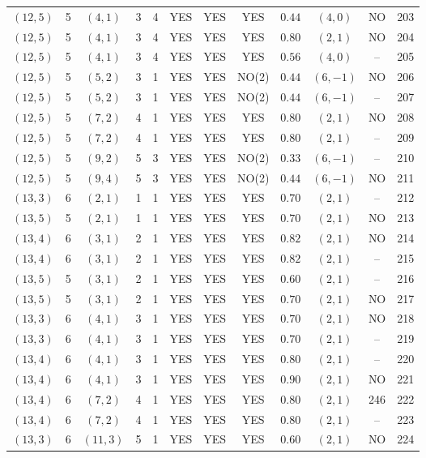 \begin{longtable}{|c|c|c|c|c|c|c|c|c|c|c|c|}
$(12,5)$ & 5 & $(4,1)$ & 3 & 4 & YES & YES & YES & $0.44$ & $(4,0)$ & NO & 203\\
$(12,5)$ & 5 & $(4,1)$ & 3 & 4 & YES & YES & YES & $0.80$ & $(2,1)$ & NO & 204\\
$(12,5)$ & 5 & $(4,1)$ & 3 & 4 & YES & YES & YES & $0.56$ & $(4,0)$ & -- & 205\\
$(12,5)$ & 5 & $(5,2)$ & 3 & 1 & YES & YES & NO(2) & $0.44$ & $(6,-1)$ & NO & 206\\
$(12,5)$ & 5 & $(5,2)$ & 3 & 1 & YES & YES & NO(2) & $0.44$ & $(6,-1)$ & -- & 207\\
$(12,5)$ & 5 & $(7,2)$ & 4 & 1 & YES & YES & YES & $0.80$ & $(2,1)$ & NO & 208\\
$(12,5)$ & 5 & $(7,2)$ & 4 & 1 & YES & YES & YES & $0.80$ & $(2,1)$ & -- & 209\\
$(12,5)$ & 5 & $(9,2)$ & 5 & 3 & YES & YES & NO(2) & $0.33$ & $(6,-1)$ & -- & 210\\
$(12,5)$ & 5 & $(9,4)$ & 5 & 3 & YES & YES & NO(2) & $0.44$ & $(6,-1)$ & NO & 211\\
$(13,3)$ & 6 & $(2,1)$ & 1 & 1 & YES & YES & YES & $0.70$ & $(2,1)$ & -- & 212\\
$(13,5)$ & 5 & $(2,1)$ & 1 & 1 & YES & YES & YES & $0.70$ & $(2,1)$ & NO & 213\\
$(13,4)$ & 6 & $(3,1)$ & 2 & 1 & YES & YES & YES & $0.82$ & $(2,1)$ & NO & 214\\
$(13,4)$ & 6 & $(3,1)$ & 2 & 1 & YES & YES & YES & $0.82$ & $(2,1)$ & -- & 215\\
$(13,5)$ & 5 & $(3,1)$ & 2 & 1 & YES & YES & YES & $0.60$ & $(2,1)$ & -- & 216\\
$(13,5)$ & 5 & $(3,1)$ & 2 & 1 & YES & YES & YES & $0.70$ & $(2,1)$ & NO & 217\\
$(13,3)$ & 6 & $(4,1)$ & 3 & 1 & YES & YES & YES & $0.70$ & $(2,1)$ & NO & 218\\
$(13,3)$ & 6 & $(4,1)$ & 3 & 1 & YES & YES & YES & $0.70$ & $(2,1)$ & -- & 219\\
$(13,4)$ & 6 & $(4,1)$ & 3 & 1 & YES & YES & YES & $0.80$ & $(2,1)$ & -- & 220\\
$(13,4)$ & 6 & $(4,1)$ & 3 & 1 & YES & YES & YES & $0.90$ & $(2,1)$ & NO & 221\\
$(13,4)$ & 6 & $(7,2)$ & 4 & 1 & YES & YES & YES & $0.80$ & $(2,1)$ & 246 & 222\\
$(13,4)$ & 6 & $(7,2)$ & 4 & 1 & YES & YES & YES & $0.80$ & $(2,1)$ & -- & 223\\
$(13,3)$ & 6 & $(11,3)$ & 5 & 1 & YES & YES & YES & $0.60$ & $(2,1)$ & NO & 224\\

\end{longtable}
